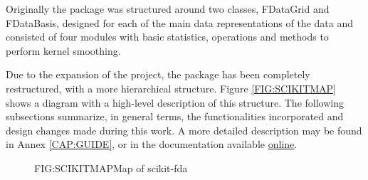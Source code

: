 
Originally the package was structured around two classes, FDataGrid and
FDataBasis, designed for each of the main data representations of the data and
consisted of four modules with basic statistics, operations and methods to
perform kernel smoothing.

Due to the expansion of the project, the package has been completely
restructured, with a more hierarchical structure. Figure \ref{FIG:SCIKITMAP}
shows a diagram with a high-level description of this structure. The following
subsections summarize, in general terms, the functionalities incorporated and
design changes made during this work. A more detailed description may be found
in Annex \ref{CAP:GUIDE}, or in the documentation available \href{https://fda.readthedocs.io/en/latest/}{online}.

\begin{figure}[Map of scikit-fda]{FIG:SCIKITMAP}{Map of scikit-fda \cite{scikitfda}}
\end{figure}
